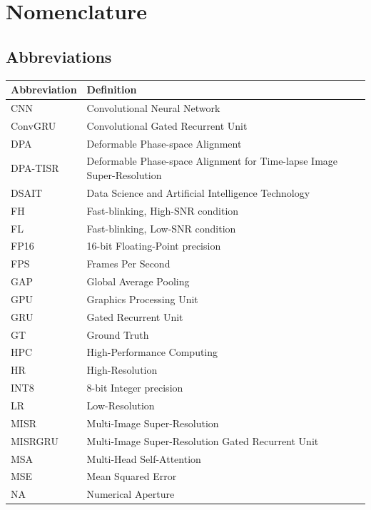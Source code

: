 \chapter*{Nomenclature}

\section*{Abbreviations}

\begin{longtable}{p{2.8cm}p{11cm}}
    \toprule
    Abbreviation & Definition \\
    \midrule\endhead
    CNN       & Convolutional Neural Network \\
    ConvGRU   & Convolutional Gated Recurrent Unit \\
    DPA       & Deformable Phase-space Alignment \\
    DPA-TISR  & Deformable Phase-space Alignment for Time-lapse Image Super-Resolution \\
    DSAIT     & Data Science and Artificial Intelligence Technology \\
    FH        & Fast-blinking, High-SNR condition \\
    FL        & Fast-blinking, Low-SNR condition \\
    FP16      & 16-bit Floating-Point precision \\
    FPS       & Frames Per Second \\
    GAP       & Global Average Pooling \\
    GPU       & Graphics Processing Unit \\
    GRU       & Gated Recurrent Unit \\
    GT        & Ground Truth \\
    HPC       & High-Performance Computing \\
    HR        & High-Resolution \\
    INT8      & 8-bit Integer precision \\
    LR        & Low-Resolution \\
    MISR      & Multi-Image Super-Resolution \\
    MISRGRU   & Multi-Image Super-Resolution Gated Recurrent Unit \\
    MSA       & Multi-Head Self-Attention \\
    MSE       & Mean Squared Error \\
    NA        & Numerical Aperture \\

\end{longtable}
